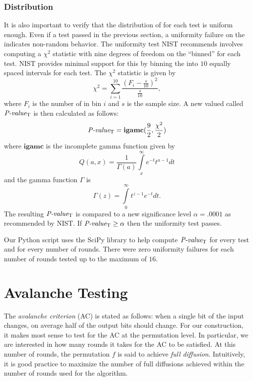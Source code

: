 \subsubsection{\pval Distribution}
It is also important to verify that the distribution of \pvals for each test is uniform enough.
Even if a test passed in the previous section, a uniformity failure on the \pvals indicates non-random behavior.
The uniformity test NIST recommends involves computing a $\chi^2$ statistic with nine degrees of freedom on the ``binned'' \pvals for each test. 
NIST provides minimal support for this by binning the \pvals into $10$ equally spaced intervals for each test.
The $\chi^2$ statistic is given by
\begin{equation*}
\chi^2 = \sum\limits_{i=1}^{10} \frac{(F_i - \frac{s}{10})^2}{\frac{s}{10}},
\end{equation*}
where $F_i$ is the number of \pvals in bin $i$ and $s$ is the sample size.
A new valued called $\textit{P-value}_\mathrm{T}$ is then calculated as follows:
\begin{equation*}
\textit{P-value}_\mathrm{T} = \mathbf{igamc}(\frac{9}{2}, \frac{\chi^2}{2})
\end{equation*}
where $\mathbf{igamc}$ is the incomplete gamma function given by
\begin{equation*}
Q(a,x) = \frac{1}{\Gamma(a)} \int\limits_{x}^{\infty} e^{-t}t^{a-1} dt
\end{equation*}
and the gamma function $\Gamma$ is
\begin{equation*}
\Gamma(z) = \int\limits_{0}^{\infty}t^{z-1}e^{-t} dt.
\end{equation*}
The resulting $\textit{P-value}_\mathrm{T}$ is compared to a new significance level $\alpha = .0001$ as recommended by NIST.
If $\textit{P-value}_\mathrm{T} \ge \alpha$ then the uniformity test passes.

Our Python script uses the SciPy library \cite{SciPy2014_Library} to help compute $\textit{P-value}_\mathrm{T}$ for every test and for every number of rounds.
There were zero uniformity failures for each number of rounds tested up to the maximum of $16$.

\section{Avalanche Testing}
The \emph{avalanche criterion} (AC) is stated as follows: when a single bit of the input changes, on average half of the output bits should change. 
For our construction, it makes most sense to test for the AC at the permutation level.
In particular, we are interested in how many rounds it takes for the AC to be satisfied.
At this number of rounds, the permutation $f$ is said to achieve \emph{full diffusion}.
Intuitively, it is good practice to maximize the number of full diffusions achieved within the number of rounds used for the algorithm.


